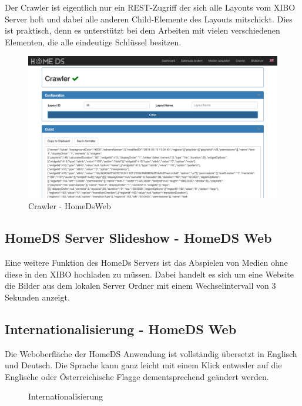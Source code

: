 Der Crawler ist eigentlich nur ein REST-Zugriff der sich alle Layouts vom XIBO Server holt und dabei alle anderen Child-Elemente des Layouts mitschickt. Dies ist praktisch, denn es unterstützt bei dem Arbeiten mit vielen verschiedenen Elementen, die alle eindeutige Schlüssel besitzen.

\begin{figure}[H]
\centering
\includegraphics[width=1\textwidth]{images/08_HomeDsWeb/Crawler.png}
\caption{Crawler - HomeDsWeb}
\label{img:crawler}
\end{figure}

\subsection{HomeDS Server Slideshow - HomeDS Web}\label{sec:homedsslideshow}
Eine weitere Funktion des HomeDs Servers ist das Abspielen von Medien ohne diese in den XIBO hochladen zu müssen. Dabei handelt es sich um eine Website die Bilder aus dem lokalen Server Ordner mit einem Wechselintervall von 3 Sekunden anzeigt. 

\subsection{Internationalisierung - HomeDS Web}\label{sec:i18n}
Die Weboberfläche der HomeDS Anwendung ist vollständig übersetzt in Englisch und Deutsch. Die Sprache kann ganz leicht mit einem Klick entweder auf die Englische oder Österreichische Flagge dementsprechend geändert werden.

\begin{figure}[H]
    \centering
    \qquad
    \caption{Internationalisierung}
    \label{img:flags}
\end{figure}

